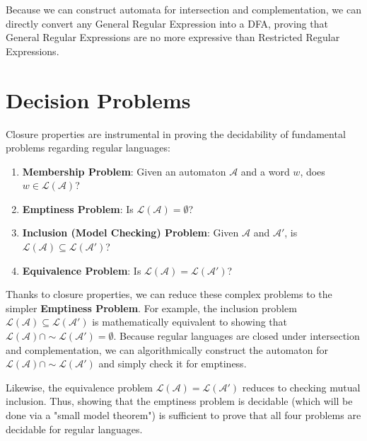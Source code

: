 Because we can construct automata for intersection and complementation, we can directly convert any General Regular Expression into a DFA, proving that General Regular Expressions are no more expressive than Restricted Regular Expressions.

\section{Decision Problems}

Closure properties are instrumental in proving the decidability of fundamental problems regarding regular languages:
\begin{enumerate}
    \item \textbf{Membership Problem}: Given an automaton $\mathcal{A}$ and a word $w$, does $w \in \mathcal{L}(\mathcal{A})$?
    \item \textbf{Emptiness Problem}: Is $\mathcal{L}(\mathcal{A}) = \emptyset$?
    \item \textbf{Inclusion (Model Checking) Problem}: Given $\mathcal{A}$ and $\mathcal{A}'$, is $\mathcal{L}(\mathcal{A}) \subseteq \mathcal{L}(\mathcal{A}')$?
    \item \textbf{Equivalence Problem}: Is $\mathcal{L}(\mathcal{A}) = \mathcal{L}(\mathcal{A}')$?
\end{enumerate}

Thanks to closure properties, we can reduce these complex problems to the simpler \textbf{Emptiness Problem}.
For example, the inclusion problem $\mathcal{L}(\mathcal{A}) \subseteq \mathcal{L}(\mathcal{A}')$ is mathematically equivalent to showing that $\mathcal{L}(\mathcal{A}) \cap \sim\mathcal{L}(\mathcal{A}') = \emptyset$. Because regular languages are closed under intersection and complementation, we can algorithmically construct the automaton for $\mathcal{L}(\mathcal{A}) \cap \sim\mathcal{L}(\mathcal{A}')$ and simply check it for emptiness.

Likewise, the equivalence problem $\mathcal{L}(\mathcal{A}) = \mathcal{L}(\mathcal{A}')$ reduces to checking mutual inclusion. Thus, showing that the emptiness problem is decidable (which will be done via a "small model theorem") is sufficient to prove that all four problems are decidable for regular languages.
